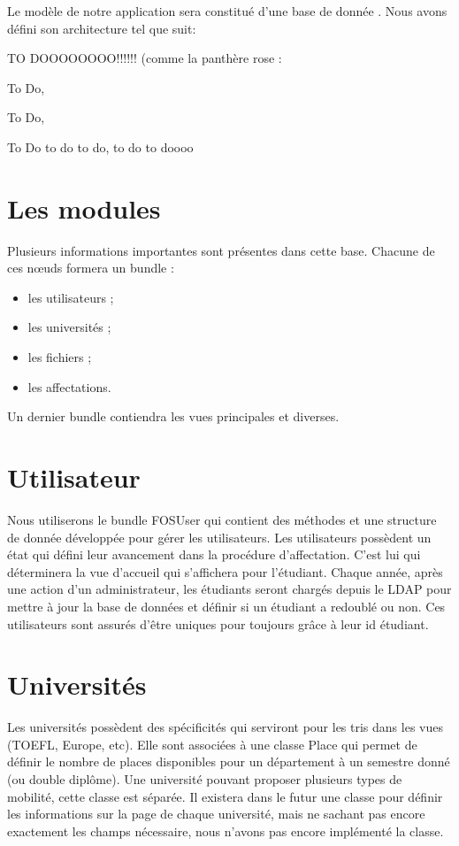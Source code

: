 Le modèle de notre application sera constitué d'une base de donnée \sql. Nous avons défini son architecture tel que suit:

TO DOOOOOOOO!!!!!! (comme la panthère rose : 

To Do,

To Do,

To Do  to do  to do, to do  to doooo


\section{Les modules}
Plusieurs informations importantes sont présentes dans cette base. Chacune de ces nœuds formera un bundle : 
\begin{itemize}
\item les utilisateurs ;
\item les universités ;
\item les fichiers ;
\item les affectations.
\end{itemize}
Un dernier bundle contiendra les vues principales et diverses.

\section{Utilisateur}

Nous utiliserons le bundle FOSUser qui contient des méthodes et une structure de donnée développée pour gérer les utilisateurs.
Les utilisateurs possèdent un état qui défini leur avancement dans la procédure d'affectation. C'est lui qui déterminera la vue d'accueil qui s'affichera pour l'étudiant. 
Chaque année, après une action d'un administrateur, les étudiants seront chargés depuis le LDAP pour mettre à jour la base de données et définir si un étudiant a redoublé ou non.
Ces utilisateurs sont assurés d'être uniques pour toujours grâce à leur id étudiant.

\section{Universités}

Les universités possèdent des spécificités qui serviront pour les tris dans les vues (TOEFL, Europe, etc).
Elle sont associées à une classe Place qui permet de définir le nombre de places disponibles pour un département à un semestre donné (ou double diplôme). Une université pouvant proposer plusieurs types de mobilité, cette classe est séparée.
Il existera dans le futur une classe pour définir les informations sur la page de chaque université, mais ne sachant pas encore exactement les champs nécessaire, nous n'avons pas encore implémenté la classe.

